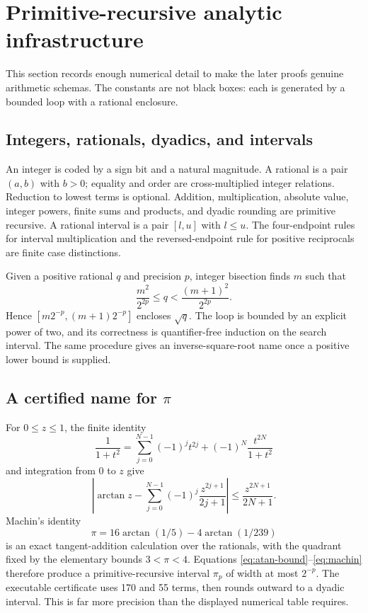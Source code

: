 \section{Primitive-recursive analytic infrastructure}\label{sec:representation}

This section records enough numerical detail to make the later proofs genuine arithmetic schemas.  The constants are not black boxes: each is generated by a bounded loop with a rational enclosure.

\subsection{Integers, rationals, dyadics, and intervals}

An integer is coded by a sign bit and a natural magnitude.  A rational is a pair $(a,b)$ with $b>0$; equality and order are cross-multiplied integer relations.  Reduction to lowest terms is optional.  Addition, multiplication, absolute value, integer powers, finite sums and products, and dyadic rounding are primitive recursive.  A rational interval is a pair $[l,u]$ with $l\le u$.  The four-endpoint rules for interval multiplication and the reversed-endpoint rule for positive reciprocals are finite case distinctions.

Given a positive rational $q$ and precision $p$, integer bisection finds $m$ such that
\[
  \frac{m^2}{2^{2p}}\le q<\frac{(m+1)^2}{2^{2p}}.
\]
Hence $[m2^{-p},(m+1)2^{-p}]$ encloses $\sqrt q$.  The loop is bounded by an explicit power of two, and its correctness is quantifier-free induction on the search interval.  The same procedure gives an inverse-square-root name once a positive lower bound is supplied.

\subsection{A certified name for \texorpdfstring{$\pi$}{pi}}

For $0\le z\le1$, the finite identity
\[
  \frac{1}{1+t^2}=\sum_{j=0}^{N-1}(-1)^j t^{2j}
      +(-1)^N\frac{t^{2N}}{1+t^2}
\]
and integration from $0$ to $z$ give
\begin{equation}\label{eq:atan-bound}
 \left|\arctan z-\sum_{j=0}^{N-1}(-1)^j\frac{z^{2j+1}}{2j+1}\right|
 \le \frac{z^{2N+1}}{2N+1}.
\end{equation}
Machin's identity
\begin{equation}\label{eq:machin}
 \pi=16\arctan(1/5)-4\arctan(1/239)
\end{equation}
is an exact tangent-addition calculation over the rationals, with the quadrant fixed by the elementary bounds $3<\pi<4$.  Equations \eqref{eq:atan-bound}--\eqref{eq:machin} therefore produce a primitive-recursive interval $\pi_p$ of width at most $2^{-p}$.  The executable certificate uses 170 and 55 terms, then rounds outward to a dyadic interval.  This is far more precision than the displayed numerical table requires.

